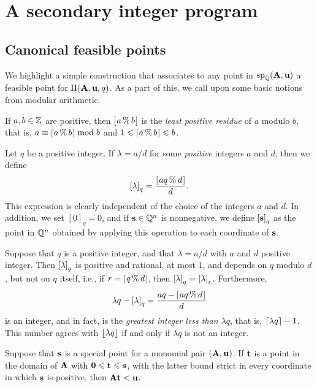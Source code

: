 \documentclass{article}
\begin{document}
\section{A secondary integer program}

\subsection{Canonical feasible points}

We highlight a simple construction that associates to any point in $\operatorname{sp}_{\mathbb{Q}}(\mathbf{A}, \mathbf{u})$ a feasible point for $\Pi(\mathbf{A}, \mathbf{u}, q)$.
As a part of this, we call upon some basic notions from modular arithmetic.

\begin{definition}
   If $a, b \in \mathbb{Z}$ are positive, then $[ \hspace{.01in} a \, \% \, b \hspace{.01in} ]$ is the \emph{least positive residue} of $a$ modulo $b$, that is, $a \equiv [ \hspace{.01in} a \, \% \, b \hspace{.01in} ] \bmod b$ and $1 \leqslant [ \hspace{.01in} a \, \% \, b \hspace{.01in} ] \leqslant b$.
\end{definition}

\begin{definition}
   \label{tail: D}
   Let $q$ be a positive integer.
   If $\lambda = a/d$ for some \emph{positive} integers $a$ and $d$, then we define
   \[ \left[ \lambda \right]_q = \frac{ [ \hspace{.01in} aq \, \% \, d \hspace{.01in} ]}{d}. \]
   This expression is clearly independent of the choice of the integers $a$ and $d$.
   In addition, we set  $[0]_q = 0$, and if $\mathbf{s} \in \mathbb{Q}^n$ is nonnegative, we define $\left[ \mathbf{s} \right]_q$ as the point in $\mathbb{Q}^n$ obtained by applying this operation to each coordinate of $\mathbf{s}$.
\end{definition}

\begin{remark}
   \label{tail-basics: R}  Suppose that $q$ is a positive integer, and that $\lambda = a/d$ with $a$ and $d$ positive integer.  Then $\left[ \lambda \right]_q$ is positive and rational, at most $1$,  and depends on $q$ modulo $d$, but not on $q$ itself, i.e., if $r = [ \hspace{.01in} q \, \% \, d \hspace{.01in} ]$, then $\left[ \lambda \right]_q = \left[ \lambda \right]_r$.  Furthermore,
   \[ \lambda q - \left[ \lambda \right]_q = \frac{aq-[ \hspace{.01in} aq \, \% \, d \hspace{.01in} ]}{d} \]
   is an integer, and in fact, is the \emph{greatest integer less than $\lambda q$}, that is, $\left\lceil \lambda q \right\rceil - 1$.
   This number agrees with $\left\lfloor  \lambda q \right\rfloor$ if and only if $\lambda q$ is not an integer.
\end{remark}

\begin{lemma}
   \label{less than u: L}
   Suppose that $\mathbf{s}$ is a special point for a monomial pair $(\mathbf{A}, \mathbf{u})$.
   If $\mathbf{t}$ is a point in the domain of $\mathbf{A}$ with $\mathbf{0} \leqslant \mathbf{t} \leqslant \mathbf{s}$, with the latter bound strict in every coordinate in which $\mathbf{s}$ is positive, then $\mathbf{A} \mathbf{t} < \mathbf{u}$.
\end{lemma}
\end{document}
